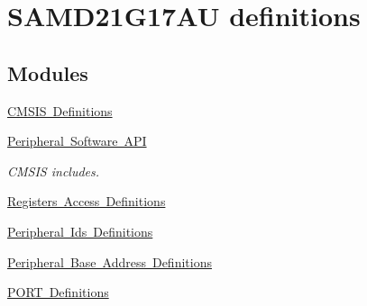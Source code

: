 \hypertarget{group___s_a_m_d21_g17_a_u__definitions}{}\section{S\+A\+M\+D21\+G17\+AU definitions}
\label{group___s_a_m_d21_g17_a_u__definitions}
\subsection*{Modules}
\begin{DoxyCompactItemize}
\item 
\mbox{\hyperlink{group___s_a_m_d21_g17_a_u__cmsis}{C\+M\+S\+I\+S Definitions}}
\item 
\mbox{\hyperlink{group___s_a_m_d21_g17_a_u__api}{Peripheral Software A\+PI}}
\begin{DoxyCompactList}\small\item\em C\+M\+S\+IS includes. \end{DoxyCompactList}\item 
\mbox{\hyperlink{group___s_a_m_d21_g17_a_u__reg}{Registers Access Definitions}}
\item 
\mbox{\hyperlink{group___s_a_m_d21_g17_a_u__id}{Peripheral Ids Definitions}}
\item 
\mbox{\hyperlink{group___s_a_m_d21_g17_a_u__base}{Peripheral Base Address Definitions}}
\item 
\mbox{\hyperlink{group___s_a_m_d21_g17_a_u__port}{P\+O\+R\+T Definitions}}
\end{DoxyCompactItemize}
